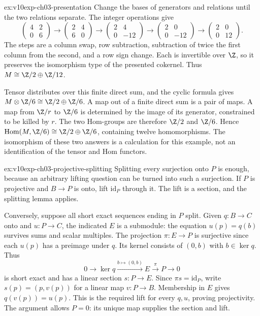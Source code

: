 \begin{solution}{ex:v10exp-ch03-presentation}
\idea Change the bases of generators and relations until the two relations separate.
\writeup The integer operations give
\[
\begin{pmatrix}4&2\\0&6\end{pmatrix}
\longrightarrow\begin{pmatrix}2&4\\6&0\end{pmatrix}
\longrightarrow\begin{pmatrix}2&4\\0&-12\end{pmatrix}
\longrightarrow\begin{pmatrix}2&0\\0&-12\end{pmatrix}
\longrightarrow\begin{pmatrix}2&0\\0&12\end{pmatrix}.
\]
The steps are a column swap, row subtraction, subtraction of twice the first column from the second, and a row sign change. Each is invertible over $\Z$, so it preserves the isomorphism type of the presented cokernel. Thus $M\cong\Z/2\oplus\Z/12$.

Tensor distributes over this finite direct sum, and the cyclic formula gives $M\otimes\Z/6\cong\Z/2\oplus\Z/6$. A map out of a finite direct sum is a pair of maps. A map from $\Z/r$ to $\Z/6$ is determined by the image of its generator, constrained to be killed by $r$. The two Hom-groups are therefore $\Z/2$ and $\Z/6$. Hence $\operatorname{Hom}(M,\Z/6)\cong\Z/2\oplus\Z/6$, containing twelve homomorphisms. The isomorphism of these two answers is a calculation for this example, not an identification of the tensor and Hom functors.
\end{solution}

\begin{solution}{ex:v10exp-ch03-projective-splitting}
\idea Splitting every surjection onto $P$ is enough, because an arbitrary lifting question can be turned into such a surjection.
\writeup If $P$ is projective and $B\to P$ is onto, lift $\mathrm{id}_P$ through it. The lift is a section, and the splitting lemma applies.

Conversely, suppose all short exact sequences ending in $P$ split. Given $q:B\to C$ onto and $u:P\to C$, the indicated $E$ is a submodule: the equation $u(p)=q(b)$ survives sums and scalar multiples. The projection $\pi:E\to P$ is surjective since each $u(p)$ has a preimage under $q$. Its kernel consists of $(0,b)$ with $b\in\ker q$. Thus
\[
0\to\ker q\xrightarrow{b\mapsto(0,b)}E\xrightarrow{\pi}P\to0
\]
is short exact and has a linear section $s:P\to E$. Since $\pi s=\mathrm{id}_P$, write $s(p)=(p,v(p))$ for a linear map $v:P\to B$. Membership in $E$ gives $q(v(p))=u(p)$. This is the required lift for every $q,u$, proving projectivity. The argument allows $P=0$: its unique map supplies the section and lift.
\end{solution}

